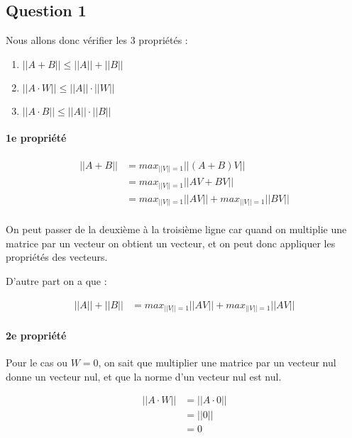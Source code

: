 \subsection{Question 1}

Nous allons donc vérifier les 3 propriétés :

\begin{enumerate}
    \item $||A + B|| \leq ||A|| + ||B||$
    \item $||A \cdot W|| \leq ||A|| \cdot ||W||$
    \item $||A \cdot B|| \leq ||A|| \cdot ||B||$
\end{enumerate}

\paragraph{1e propriété}

\begin{equation}
	\begin{aligned}
		||A + B|| &= max_{||V||=1}||(A + B)V||\\
		&= max_{||V||=1}||AV + BV||\\
		&= max_{||V||=1}||AV|| + max_{||V||=1}||BV||\\
	\end{aligned}
\end{equation}

On peut passer de la deuxième à la troisième ligne car quand on multiplie une matrice par un vecteur on obtient un vecteur, et on peut donc appliquer les propriétés des vecteurs.

D'autre part on a que :

\begin{equation}
	\begin{aligned}
		||A|| + ||B|| &= max_{||V||=1}||AV|| + max_{||V||=1}||AV||
	\end{aligned}
\end{equation}

\paragraph{2e propriété}

Pour le cas ou $W = 0$, on sait que multiplier une matrice par un vecteur nul donne un vecteur nul, et que la norme d'un vecteur nul est nul.

\begin{equation}
	\begin{aligned}
		||A \cdot W|| &= ||A \cdot 0||\\
		&= ||0||\\
		&= 0
	\end{aligned}
\end{equation}


